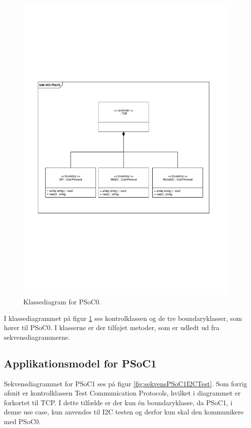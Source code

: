 \begin{figure}[H]
	\centering
	\includegraphics[width=\textwidth]{Systemarkitektur/images/klassediagramPSoC0}
	\caption{Klassediagram for PSoC0.}
	\label{fig:klassePSoC0}
\end{figure}

I klassediagrammet på figur \ref{fig:klassePSoC0} ses kontrolklassen og de tre boundaryklasser, som hører til PSoC0. I klasserne er der tilføjet metoder, som er udledt ud fra sekvensdiagrammerne. 

\subsection{Applikationsmodel for PSoC1}
Sekvensdiagrammet for PSoC1 ses på figur \ref{fig:sekvensPSoC1I2CTest}. Som forrig afsnit er kontrolklassen Test Communication Protocols, hvilket i diagrammet er forkortet til TCP. I dette tilfælde er der kun én boundaryklasse, da PSoC1, i denne use case, kun anvendes til I2C testen og derfor kun skal den kommunikere med PSoC0. 

